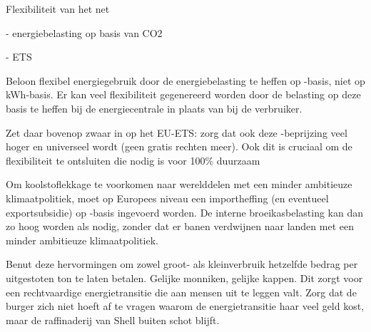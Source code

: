 \begin{voorstel}{Flexibiliteit van het net}
\begin{multicols}{2}
\begin{aanbevelingen}
- energiebelasting op basis van CO2

- ETS

Beloon flexibel energiegebruik door de energiebelasting te heffen op \COO-basis, niet op kWh-basis. Er kan veel flexibiliteit gegenereerd worden door de belasting op deze basis te heffen bij de energiecentrale in plaats van bij de verbruiker.

Zet daar bovenop zwaar in op het EU-ETS: zorg dat ook deze \COO-beprijzing veel hoger en universeel wordt (geen gratis rechten meer). Ook dit is cruciaal om de flexibiliteit te ontsluiten die nodig is voor 100\% duurzaam

Om koolstoflekkage te voorkomen naar werelddelen met een minder ambitieuze klimaatpolitiek, moet op Europees niveau een importheffing (en eventueel exportsubsidie) op \COO-basis ingevoerd worden. De interne broeikasbelasting kan dan zo hoog worden als nodig, zonder dat er banen verdwijnen naar landen met een minder ambitieuze klimaatpolitiek. 

Benut deze hervormingen om zowel groot- als kleinverbruik hetzelfde bedrag per uitgestoten ton \COO te laten betalen. Gelijke monniken, gelijke kappen. Dit zorgt voor een rechtvaardige energietransitie die aan mensen uit te leggen valt. Zorg dat de burger zich niet hoeft af te vragen waarom de energietransitie haar veel geld kost, maar de raffinaderij van Shell buiten schot blijft.


\end{aanbevelingen}

\end{multicols}

\end{voorstel}
